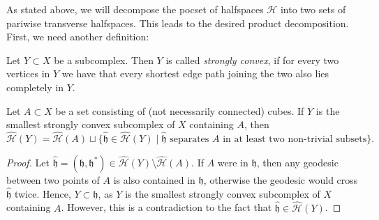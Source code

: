 As stated above, we will decompose the pocset of halfspaces \(\mathcal{H}\) into two sets of pariwise transverse halfspaces. This leads to the desired product decomposition. First, we need another definition:

\begin{defin}
  Let \(Y \subset X\) be a subcomplex. Then \(Y\) is called \emph{strongly convex}, if for every two vertices in \(Y\) we have that every shortest edge path joining the two also lies completely in \(Y\).
\end{defin}

\begin{lemma}[{\cite[Lemma~4.16]{MR3509968}}]
  \label{lem:4.16}
  Let \(A \subset X\) be a set consisting of (not necessarily connected) cubes. If \(Y\) is the smallest strongly convex subcomplex of \(X\) containing \(A\), then
  \[
    \mathcal{\hat H}(Y) = \mathcal{\hat H}(A) \sqcup \{\mathfrak{\hat h} \in \mathcal{\hat H}(Y) \mid \mathfrak{\hat h} \text{ separates } A \text{ in at least two non-trivial subsets}\}.
  \]
\end{lemma}

\begin{proof}
  Let \(\mathfrak{\hat h} = (\mathfrak{h}, \mathfrak{h}^\ast) \in \mathcal{\hat H}(Y) \setminus \mathcal{\hat H}(A)\). If \(A\) were in \(\mathfrak{h}\), then any geodesic between two points of \(A\) is also contained in \(\mathfrak{h}\), otherwise the geodesic would cross \(\mathfrak{\hat h}\) twice. Hence, \(Y \subset \mathfrak{h}\), as \(Y\) is the smallest strongly convex subcomplex of \(X\) containing \(A\). However, this is a contradiction to the fact that \(\mathfrak{\hat h} \in \mathcal{\hat H}(Y)\).
\end{proof}

